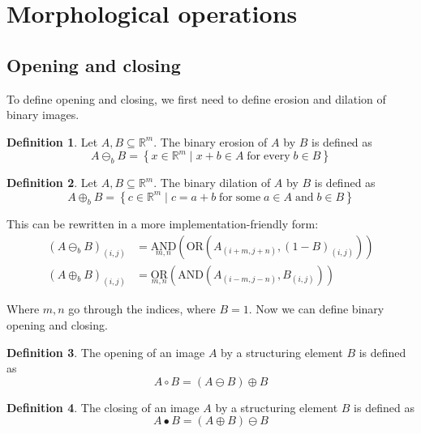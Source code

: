 \documentclass[a4paper,12pt]{article}
\theoremstyle{plain}
\theoremstyle{definition}
\newtheorem{definition}{Definition}
\theoremstyle{remark}
\begin{document}
\newpage

\section{Morphological operations}

\subsection{Opening and closing}

To define opening and closing, we first need to define erosion and dilation of binary images.

\begin{definition}
	Let $A, B \subseteq \mathbb{R}^m$. The binary erosion of $A$ by $B$ is defined as
	\begin{equation*}
		A \ominus_b B = \left\{ x \in \mathbb{R}^m \mid x + b \in A \; \mathrm{for \; every} \; b \in B \right\}
	\end{equation*}
\end{definition}
\begin{definition}
	Let $A, B \subseteq \mathbb{R}^m$. The binary dilation of $A$ by $B$ is defined as
	\begin{equation*}
		A \oplus_b B = \left\{ c \in \mathbb{R}^m \mid c = a + b \; \mathrm{for \; some} \; a \in A \; \mathrm{and} \; b \in B \right\}
	\end{equation*}
\end{definition}

This can be rewritten in a more implementation-friendly form:
\begin{align*}
	(A \ominus_b B)_{(i, j)} &= \underset{m, n}{\mathrm{AND}} \left( \mathrm{OR} (A_{(i + m, j + n)}, (1 - B)_{(i, j)}) \right) \\
	(A \oplus_b B)_{(i, j)} &= \underset{m, n}{\mathrm{OR}} \left( \mathrm{AND} (A_{(i - m, j - n)}, B_{(i, j)}) \right)
\end{align*}

Where $m, n$ go through the indices, where $B = 1$. Now we can define binary opening and closing.

\begin{definition}
	The opening of an image $A$ by a structuring element $B$ is defined as
	\begin{equation*}
		A \circ B = (A \ominus B) \oplus B
	\end{equation*}
\end{definition}
\begin{definition}
	The closing of an image $A$ by a structuring element $B$ is defined as
	\begin{equation*}
		A \bullet B = (A \oplus B) \ominus B
	\end{equation*}
\end{definition}
\end{document}
